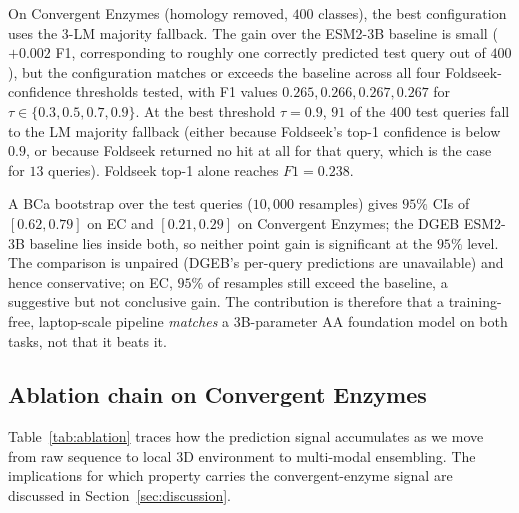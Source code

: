 \documentclass[11pt,letterpaper]{article}
\begin{document}
On Convergent Enzymes (homology removed, $400$ classes), the best
configuration uses the 3-LM majority fallback. The gain over the
ESM2-3B baseline is small ($+0.002$ F1, corresponding to roughly one
correctly predicted test query out of $400$), but the configuration
matches or exceeds the baseline across all four Foldseek-confidence
thresholds tested, with F1 values $0.265, 0.266, 0.267, 0.267$ for
$\tau \in \{0.3, 0.5, 0.7, 0.9\}$. At the best threshold $\tau = 0.9$,
$91$ of the $400$ test queries fall to the LM majority fallback
(either because Foldseek's top-1 confidence is below $0.9$, or
because Foldseek returned no hit at all for that query, which is the
case for $13$ queries). Foldseek top-1 alone reaches $F1 = 0.238$.

A BCa bootstrap over the test queries ($10{,}000$ resamples) gives
$95\%$ CIs of $[0.62, 0.79]$ on EC and $[0.21, 0.29]$ on Convergent
Enzymes; the DGEB ESM2-3B baseline lies inside both, so neither point
gain is significant at the $95\%$ level. The comparison is unpaired
(DGEB's per-query predictions are unavailable) and hence conservative;
on EC, $95\%$ of resamples still exceed the baseline, a suggestive but
not conclusive gain. The contribution is therefore that a
training-free, laptop-scale pipeline \emph{matches} a 3B-parameter AA
foundation model on both tasks, not that it beats it.

\subsection{Ablation chain on Convergent Enzymes}

Table~\ref{tab:ablation} traces how the prediction signal accumulates
as we move from raw sequence to local 3D environment to multi-modal
ensembling. The implications for which property carries the
convergent-enzyme signal are discussed in
Section~\ref{sec:discussion}.
\end{document}

